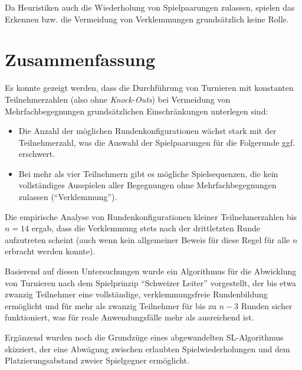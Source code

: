 \documentclass[DIV=15, 10pt]{scrartcl}
\begin{document}
Da Heuristiken auch die Wiederholung von Spielpaarungen zulassen, spielen das Erkennen bzw. die Vermeidung von Verklemmungen grundsätzlich keine Rolle.

\section{Zusammenfassung}
\label{laZusammenfassung}

Es konnte gezeigt werden, dass die Durchführung von Turnieren mit konstanten Teilnehmerzahlen (also ohne \emph{Knock-Outs}) bei Vermeidung von Mehrfachbegegnungen grundsätzlichen Einschränkungen unterlegen sind:

\begin{itemize}

\item Die Anzahl der möglichen Rundenkonfigurationen wächst stark mit der Teilnehmerzahl, was die Auswahl der Spielpaarungen für die Folgerunde ggf. erschwert.

\item Bei mehr als vier Teilnehmern gibt es mögliche Spielsequenzen, die kein vollständiges Ausspielen aller Begegnungen ohne Mehrfachbegegnungen zulassen ("`Verklemmung"').

\end{itemize}

Die empirische Analyse von Rundenkonfigurationen kleiner Teilnehmerzahlen bis $n=14$ ergab, dass die Verklemmung stets nach der drittletzten Runde aufzutreten scheint (auch wenn kein allgemeiner Beweis für diese Regel für alle $n$ erbracht werden konnte).

Basierend auf diesen Untersuchungen wurde ein Algorithmus für die Abwicklung von Turnieren nach dem Spielprinzip "`Schweizer Leiter"' vorgestellt, der bis etwa zwanzig Teilnehmer eine vollständige, verklemmungsfreie Rundenbildung ermöglicht und für mehr als zwanzig Teilnehmer für bis zu $n-3$ Runden sicher funktioniert, was für reale Anwendungsfälle mehr als ausreichend ist.

Ergänzend wurden noch die Grundzüge eines abgewandelten SL-Algorithmus skizziert, der eine Abwägung zwischen erlaubten Spielwiederholungen und dem Platzierungsabstand zweier Spielgegner ermöglicht.
\end{document}
